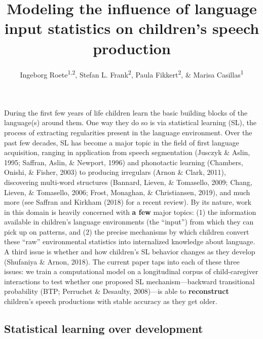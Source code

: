 \documentclass[
  english,
  man,mask,floatsintext]{apa6}
\title{Modeling the influence of language input statistics on children's speech production}
\author{Ingeborg Roete\textsuperscript{1,2}, Stefan L. Frank\textsuperscript{2}, Paula Fikkert\textsuperscript{2}, \& Marisa Casillas\textsuperscript{1}}
\date{}
\begin{document}
\maketitle

During the first few years of life children learn the basic building blocks of the language(s) around them. One way they do so is via statistical learning (SL), the process of extracting regularities present in the language environment. Over the past few decades, SL has become a major topic in the field of first language acquisition, ranging in application from speech segmentation (Jusczyk \& Aslin, 1995; Saffran, Aslin, \& Newport, 1996) and phonotactic learning (Chambers, Onishi, \& Fisher, 2003) to producing irregulars (Arnon \& Clark, 2011), discovering multi-word structures (Bannard, Lieven, \& Tomasello, 2009; Chang, Lieven, \& Tomasello, 2006; Frost, Monaghan, \& Christiansen, 2019), and much more (see Saffran and Kirkham (2018) for a recent review). By its nature, work in this domain is heavily concerned with \textbf{a few} major topics: (1) the information available in children's language environments (the \enquote{input}) from which they can pick up on patterns, and (2) the precise mechanisms by which children convert these \enquote{raw} environmental statistics into internalized knowledge about language. A third issue is whether and how children's SL behavior changes as they develop (Shufaniya \& Arnon, 2018). The current paper taps into each of these three issues: we train a computational model on a longitudinal corpus of child-caregiver interactions to test whether one proposed SL mechanism---backward transitional probability (BTP; Perruchet \& Desaulty, 2008)---is able to \textbf{reconstruct} children's speech productions with stable accuracy as they get older.

\hypertarget{statistical-learning-over-development}{%
\subsection{\texorpdfstring{\textbf{Statistical learning} over development}{Statistical learning over development}}\label{statistical-learning-over-development}}
\end{document}
